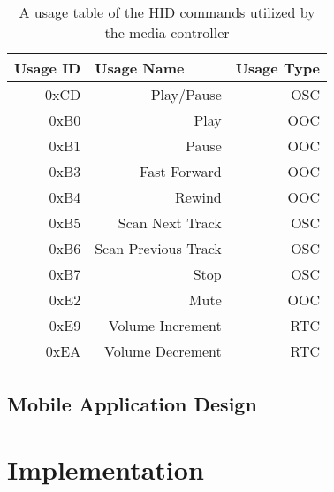 \documentclass{article}
\begin{document}
			\begin{table}[h]
				\centering
				\caption{A usage table of the HID commands utilized by the media-controller}
				\label{my-label}
				\begin{tabular}{|r|r|r|}
					\hline
					\multicolumn{1}{|l|}{Usage ID} & \multicolumn{1}{l|}{Usage Name} & \multicolumn{1}{l|}{Usage Type} \\ \hline
					0xCD                           & Play/Pause                      & OSC                             \\
					0xB0                           & Play                            & OOC                             \\
					0xB1                           & Pause                           & OOC                             \\
					0xB3                           & Fast Forward                    & OOC                             \\
					0xB4                           & Rewind                          & OOC                             \\
					0xB5                           & Scan Next Track                 & OSC                             \\
					0xB6                           & Scan Previous Track             & OSC                             \\
					0xB7                           & Stop                            & OSC                             \\
					0xE2                           & Mute                            & OOC                             \\
					0xE9                           & Volume Increment                & RTC                             \\
					0xEA                           & Volume Decrement                & RTC                             \\ \hline
				\end{tabular}
			\end{table}
		
		\subsection{Mobile Application Design}
			\lipsum[1]

	\section{Implementation}
\end{document}
